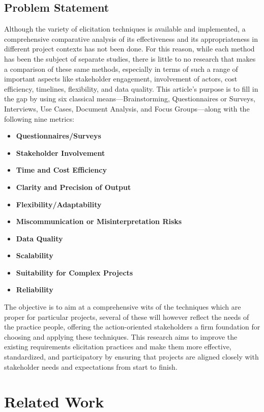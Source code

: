 \documentclass[conference]{IEEEtran}
\begin{document}
\subsection{Problem Statement}

Although the variety of elicitation techniques is available and implemented, a comprehensive comparative analysis of its effectiveness and its appropriateness in different project contexts has not been done. For this reason, while each method has been the subject of separate studies, there is little to no research that makes a comparison of these same methods, especially in terms of such a range of important aspects like stakeholder engagement, involvement of actors, cost efficiency, timelines, flexibility, and data quality. This article's purpose is to fill in the gap by using six classical means—Brainstorming, Questionnaires or Surveys, Interviews, Use Cases, Document Analysis, and Focus Groups—along with the following nine metrics:
\begin{itemize}
    \item \textbf{Questionnaires/Surveys}
    \item \textbf{Stakeholder Involvement}
    \item \textbf{Time and Cost Efficiency}
    \item \textbf{Clarity and Precision of Output}
    \item \textbf{Flexibility/Adaptability}
    \item \textbf{Miscommunication or Misinterpretation Risks}
    \item \textbf{Data Quality}
    \item \textbf{Scalability}
    \item \textbf{Suitability for Complex Projects}
    \item \textbf{Reliability}
\end{itemize}

The objective is to aim at a comprehensive wits of the techniques which are proper for particular projects, several of these will however reflect the needs of the practice people, offering the action-oriented stakeholders a firm foundation for choosing and applying these techniques. This research aims to improve the existing requirements elicitation practices and make them more effective, standardized, and participatory by ensuring that projects are aligned closely with stakeholder needs and expectations from start to finish.


\section{Related Work}
\end{document}
